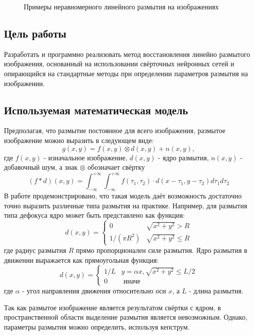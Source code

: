 \begin{figure}[h!]
\begin{subfigure}[b]{0.5\linewidth}
  \end{subfigure}
  \caption{Примеры неравномерного линейного размытия на изображениях}
  \label{fig:lblur}
\end{figure}

\subsection{Цель работы}
Разработать и программно реализовать метод восстановления линейно размытого изображения, основанный на использовании свёрточных нейронных сетей и опирающийся на стандартные методы при определении параметров размытия на изображении.


\subsection{Используемая математическая модель }
Предполагая, что размытие постоянное для всего изображения, 
размытое изображение можно выразить в следующем виде:
\begin{equation}
g(x, y)=f(x, y) \otimes d(x, y)+n(x, y),
\label{conv_formula}
\end{equation}
где $f(x,y)$ - изначальное изображение, $d(x, y)$ - ядро размытия, $n(x,y)$ - добавочный шум, а знак $\otimes$ обозначает свёртку $$(f * d)(x, y)=\int_{-\infty}^{+\infty} \int_{-\infty}^{+\infty} f\left(\tau_{1}, \tau_{2}\right) \cdot d\left(x-\tau_{1}, y-\tau_{2}\right) d \tau_{1} d \tau_{2}$$
В работе \cite{kopeika} продемонстрировано, что такая модель даёт возможность достаточно точно выразить различные типа размытия на практике. 
Например, для размытия типа дефокуса ядро может быть представлено как функция:
\begin{equation}
d(x, y)=\left\{\begin{array}{ll}
0 & \sqrt{x^{2}+y^{2}}>R \\
1 /\left(\pi R^{2}\right) & \sqrt{x^{2}+y^{2}} \leq R
\end{array}\right.
\end{equation}
где радиус размытия $R$ прямо пропорционален силе размытия. 
Ядро размытия в движении выражается как прямоугольная функция:
\begin{equation}
d(x, y)=\left\{\begin{array}{ll}
 1/L & y = \alpha x, \sqrt{x^{2}+y^{2}} \leq L/2 \\
0 & \text { иначе}
\end{array}\right.
\end{equation}
где  $\alpha$  - угол направления движения относительно оси $x$, 
а $L$ - длина размытия.
\par
Так как размытое изображение является результатом свёртки с ядром, в пространственной области выделение размытия является невозможным. Однако, параметры размытия можно определить, используя кепструм.

